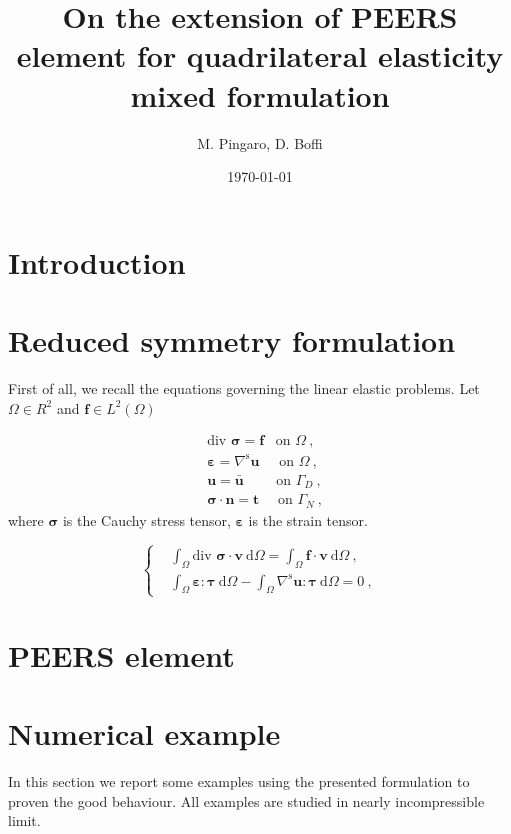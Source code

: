 \documentclass[a4paper,11pt]{article}
\title{\textbf{On the extension of PEERS element for quadrilateral elasticity mixed formulation}}
\date{\today}
\author{M. Pingaro, D. Boffi}
\newcommand{\intd}{\int_{\Omega}}
\newcommand{\dd}{\: \text{d}\Omega}
\newcommand{\bu}{\bm{u}}
\newcommand{\bv}{\bm{v}}
\newcommand{\bsigma}{\bm{\sigma}}
\newcommand{\strain}{\bm{\varepsilon}}
\newcommand{\btau}{\bm{\tau}}
\newcommand{\symm}{^\text{s}}
\newcommand{\grads}{\nabla\symm}
\newcommand{\divsig}{\mbox{div }\bsigma}
\begin{document}
\maketitle

\section{Introduction}

\section{Reduced symmetry formulation}
First of all, we recall the equations governing the linear elastic problems.
Let $\Omega \in R^{2}$ and $\bm{f}\in L^{2}(\Omega)$ 

\begin{equation} \label{eq:equilibium_congruence}
\begin{split}
&\divsig = \bm{f} \hspace{10pt} \mbox{on } \Omega\:, \\
&\strain = \grads\bu \hspace{17pt} \mbox{on } \Omega\:, \\
&\bu = \bar{\bu} \hspace{28pt} \mbox{on } \Gamma_{D}\:, \\
&\bsigma\cdot \bm{n} = \bm{t} \hspace{16pt} \mbox{on } \Gamma_{N}\:,
\end{split}
\end{equation}
where $\bsigma$ is the Cauchy stress tensor, $\strain$ is the strain tensor.

\begin{equation}
\left\lbrace
\begin{split}
&\intd \divsig \cdot \bv \dd = \intd \bm{f}\cdot\bv\dd\:,\\
&\intd \strain : \btau \dd - \intd \grads\bu : \btau \dd = 0\:,
\end{split}
\right.
\end{equation}


\section{PEERS element}

\section{Numerical example}
In this section we report some examples using the presented formulation to proven the good behaviour. All examples are studied in nearly incompressible limit. 
\end{document}
